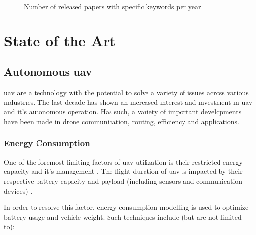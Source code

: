 \documentclass[runningheads]{llncs}
\begin{document}
\begin{figure}[htb]
\caption{Number of released papers with specific keywords per year}
\label{fig:fs}
\end{figure}

\section{State of the Art}

\subsection{Autonomous \acrshort{uav}}

\acrshort{uav} are a technology with the potential to solve a variety of issues across various industries. The last decade has shown an increased interest and investment in \acrshort{uav} and it's autonomous operation. Has such, a variety of important developments have been made in drone communication, routing, efficiency and applications.

\subsubsection{Energy Consumption}

One of the foremost limiting factors of \acrshort{uav} utilization is their restricted energy capacity and it's management \cite{8255733}. The flight duration of \acrshort{uav} is impacted by their respective battery capacity and payload (including sensors and communication devices) \cite{8579209}.

In order to resolve this factor, energy consumption modelling is used to optimize battery usage and vehicle weight. Such techniques include (but are not limited to):
\end{document}
